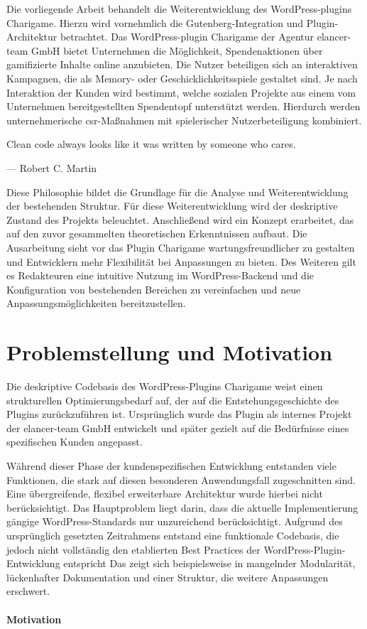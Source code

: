 Die vorliegende Arbeit behandelt die Weiterentwicklung des WordPress-\gls{plugin}s Charigame.
Hierzu wird vornehmlich die Gutenberg-Integration und Plugin-Architektur betrachtet.
Das WordPress-\gls{plugin} Charigame der Agentur elancer-team GmbH bietet Unternehmen die Möglichkeit, Spendenaktionen über gamifizierte Inhalte online anzubieten.
Die Nutzer beteiligen sich an interaktiven Kampagnen, die als Memory- oder Geschicklichkeitsspiele gestaltet sind.
Je nach Interaktion der Kunden wird bestimmt, welche sozialen Projekte aus einem vom Unternehmen bereitgestellten Spendentopf unterstützt werden.
Hierdurch werden unternehmerische \gls{csr}-Maßnahmen mit spielerischer Nutzerbeteiligung kombiniert.

\epigraph{ \glqq Clean code always looks like it was written by someone who cares.\grqq{}}{--- \textup{Robert C. Martin}}

Diese Philosophie bildet die Grundlage für die Analyse und Weiterentwicklung der bestehenden Struktur.
Für diese Weiterentwicklung wird der deskriptive Zustand des Projekts beleuchtet.
Anschließend wird ein Konzept erarbeitet, das auf den zuvor gesammelten theoretischen Erkenntnissen aufbaut.
Die Ausarbeitung sieht vor das Plugin Charigame wartungsfreundlicher zu gestalten und Entwicklern mehr Flexibilität bei Anpassungen zu bieten.
Des Weiteren gilt es Redakteuren eine intuitive Nutzung im WordPress-Backend und die Konfiguration von bestehenden Bereichen zu vereinfachen und neue Anpassungsmöglichkeiten bereitzustellen.

\section{Problemstellung und Motivation}

Die deskriptive Codebasis des WordPress-Plugins Charigame weist einen strukturellen Optimierungsbedarf auf, der auf die Entstehungsgeschichte des Plugins zurückzuführen ist.
Ursprünglich wurde das Plugin als internes Projekt der elancer-team GmbH entwickelt und später gezielt auf die Bedürfnisse eines spezifischen Kunden angepasst.

Während dieser Phase der kundenspezifischen Entwicklung entstanden viele Funktionen, die stark auf diesen besonderen Anwendungsfall zugeschnitten sind.
Eine übergreifende, flexibel erweiterbare Architektur wurde hierbei nicht berücksichtigt.
Das Hauptproblem liegt darin, dass die aktuelle Implementierung gängige WordPress-Standards nur unzureichend berücksichtigt.
Aufgrund des ursprünglich gesetzten Zeitrahmens entstand eine funktionale Codebasis, die jedoch nicht vollständig den etablierten Best Practices der WordPress-Plugin-Entwicklung entspricht
Das zeigt sich beispielsweise in mangelnder Modularität, lückenhafter Dokumentation und einer Struktur, die weitere Anpassungen erschwert.
\\\\
\textbf{Motivation}

